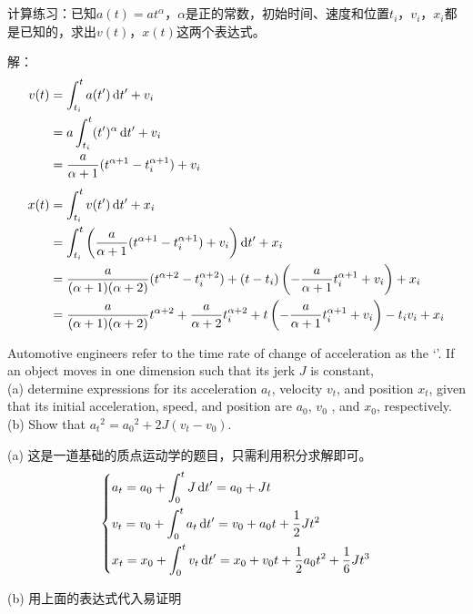 \chapter[质点运动学与动力学基础]{}
\begin{solution}[质点运动学计算]
    计算练习：已知$a(t)=at^{\alpha }$，$\alpha$是正的常数，初始时间、速度和位置$t_{i}$，$v_{i}$，$x_{i}$都是已知的，求出$v(t)$，$x(t)$这两个表达式。 
    
    \tcbrule
    
    解：
\[  
	\begin{aligned}
	    v(t)&=\int_{t_{i}}^{t}a(t')\dif t'+v_{i} \\
	    &=a\int_{t_{i}}^{t}(t')^{\alpha}\dif t'+v_{i}\\
	    &=\frac{a}{\alpha+1}(t^{\alpha+1}-t_{i}^{\alpha+1})+v_{i}\\[1ex]
	    x(t)&=\int_{t_{i}}^{t}v(t')\dif t'+x_{i}\\
        &=\int_{t_{i}}^{t}\left(\frac{a}{\alpha+1}(t^{\alpha+1}-t_{i}^{\alpha+1})+v_{i}\right)\dif t'+x_{i}\\
        &=\frac{a}{(\alpha+1)(\alpha+2)}(t^{\alpha+2}-t_{i}^{\alpha+2})+(t-t_{i})\left(-\frac{a}{\alpha+1}t_{i}^{\alpha+1}+v_{i}\right)+x_{i}\\
        &=\frac{a}{(\alpha+1)(\alpha+2)}t^{\alpha+2}+\frac{a}{\alpha+2}t_{i}^{\alpha+2}+t\left(-\frac{a}{\alpha+1}t_{i}^{\alpha+1}+v_{i}\right)-t_{i}v_{i}+x_{i}
    \end{aligned}
\]

\end{solution}
\begin{solution}[质点运动学计算]
    Automotive engineers refer to the time rate of change
    of acceleration as the `'. If an object moves in one dimension such that its jerk $J$ is constant,\\   
    (a) determine expressions for its acceleration $a_{t}$, velocity $v_{t}$, and position $x_{t}$, given that its initial acceleration, speed, and position are $a_{0}$, $ v_{0} $ , and $x_{0}$, respectively.\\
    (b) Show that $ a_{t}{}^ {2} = a_{0}{}^ {2}  +2J(  v_ {t}  -  v_ {0}  )$.
	
	\tcbrule
	
	(a) 这是一道基础的质点运动学的题目，只需利用积分求解即可。
	\[\left\{
		\begin{aligned}
			&a_{t}=a_{0}+\int_{0}^{t}J\dif t'=a_{0}+Jt\\
            &v_{t}=v_{0}+\int_{0}^{t}a_{t}\dif t'=v_{0}+a_{0}t+\frac{1}{2}Jt^{2}\\
            &x_{t}=x_{0}+\int_{0}^{t}v_{t}\dif t'=x_{0}+v_{0}t+\frac{1}{2}a_{0}t^{2}+\frac{1}{6}Jt^{3}
		\end{aligned}
		\right.\]
    
    (b) 用上面的表达式代入易证明
\end{solution}
